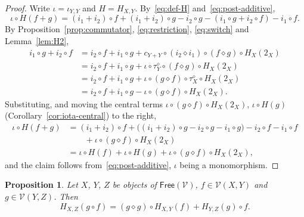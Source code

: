 \documentclass[reqno,a4paper]{amsart}
\theoremstyle{plain}
\newtheorem{proposition}[subsection]{Proposition}
\theoremstyle{definition}
\newcommand{\V}{\ensuremath{\mathcal{V}}}
\newcommand{\Free}{\ensuremath{\mathsf{Free}}}
\newcommand{\cosmash}{\ensuremath{\diamond}}
\newcommand{\cc}[1]{\ensuremath{c_{#1}}}                    %
\newcommand{\swc}[1]{\ensuremath{\tau^{\cosmash}_{#1}}}          %
\begin{document}
\begin{proof}
  Write \(\iota=\iota_{Y,Y}\) and \(H=H_{X,Y}\). By~\eqref{eq:def-H} and~\eqref{eq:post-additive},
  \[
    \iota\circ H(f+g)=(i_{1}+i_{2})\circ f+(i_{1}+i_{2})\circ g-i_{2}\circ g-(i_{1}\circ g+i_{2}\circ f)-i_{1}\circ f\text{.}
  \]
  By Proposition~\ref{prop:commutator}, \eqref{eq:restriction}, \eqref{eq:switch} and Lemma~\ref{lem:H2},
  \begin{align*}
    i_{1}\circ g+i_{2}\circ f & =i_{2}\circ f+i_{1}\circ g+\cc{Y+Y}\circ(i_{2}\cosmash i_{1})\circ(f\cosmash g)\circ H_{X}(2_{X}) \\
                              & =i_{2}\circ f+i_{1}\circ g+\iota\circ\swc{Y}\circ(f\cosmash g)\circ H_{X}(2_{X})                  \\
                              & =i_{2}\circ f+i_{1}\circ g+\iota\circ(g\cosmash f)\circ\swc{X}\circ H_{X}(2_{X})                  \\
                              & =i_{2}\circ f+i_{1}\circ g-\iota\circ(g\cosmash f)\circ H_{X}(2_{X})\text{.}
  \end{align*}
  Substituting, and moving the central terms \(\iota\circ(g\cosmash f)\circ H_{X}(2_{X})\), \(\iota\circ H(g)\) (Corollary~\ref{cor:iota-central}) to the right,
  \begin{align*}
    \iota\circ H(f+g) & =(i_{1}+i_{2})\circ f+\bigl((i_{1}+i_{2})\circ g-i_{2}\circ g-i_{1}\circ g\bigr)-i_{2}\circ f-i_{1}\circ f \\
                      & \qquad+\iota\circ(g\cosmash f)\circ H_{X}(2_{X})                                                           \\
                      & =\iota\circ H(f)+\iota\circ H(g)+\iota\circ(g\cosmash f)\circ H_{X}(2_{X})\text{,}
  \end{align*}
  and the claim follows from~\eqref{eq:post-additive}, \(\iota\) being a monomorphism.
\end{proof}

\begin{proposition}\label{prop:H-composite}
  Let \(X\), \(Y\), \(Z\) be objects of \(\Free(\V)\), \(f\in\V(X,Y)\) and \(g\in\V(Y,Z)\). Then
  \[
    H_{X,Z}(g\circ f)=(g\cosmash g)\circ H_{X,Y}(f)+H_{Y,Z}(g)\circ f\text{.}
  \]
\end{proposition}
\end{document}
